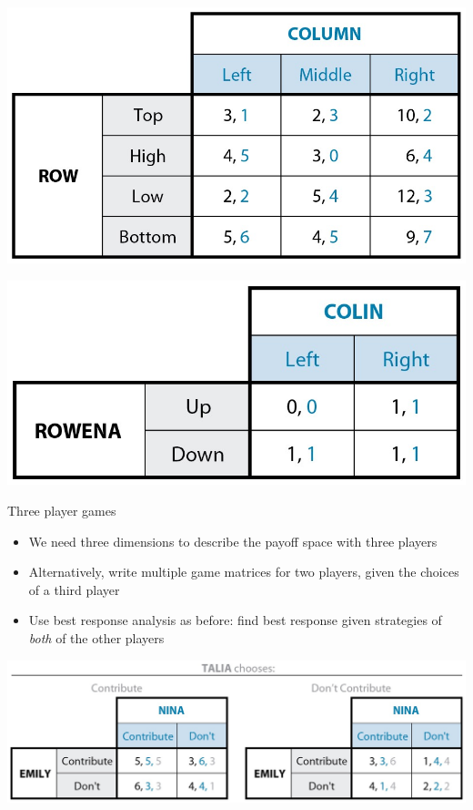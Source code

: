 \documentclass[10pt]{beamer}
\begin{document}
\begin{frame}[label={sec:org54e7d29}]{}
\begin{center}
\includegraphics[width=.75\textwidth]{./img/GAMES4_FIG04.01.jpg}
\end{center}
\end{frame}

\begin{frame}[label={sec:org6733a4b}]{}
\begin{center}
\includegraphics[width=.75\textwidth]{./img/GAMES4_FIG04.06.jpg}
\end{center}
\end{frame}


\begin{frame}[label={sec:orgc72f2ae}]{}
\alert{Three player games}
\begin{itemize}
\item We need three dimensions to describe the payoff space with three players
\item Alternatively, write multiple game matrices for two players, given the choices of a third player
\item Use best response analysis as before: find best response given strategies of \emph{both} of the other players
\end{itemize}
\end{frame}

\begin{frame}[label={sec:org60c7691}]{}
\begin{center}
\includegraphics[width=.75\textwidth]{./img/GAMES4_FIG04.08.jpg}
\end{center}
\end{frame}
\end{document}
